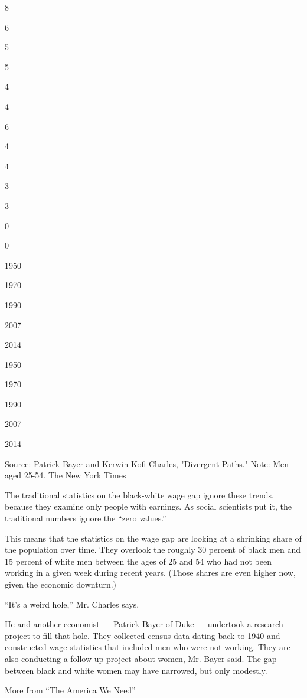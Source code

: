 8

6

5

5

4

4

6

4

4

3

3

0

0

1950

1970

1990

2007

2014

1950

1970

1990

2007

2014

Source: Patrick Bayer and Kerwin Kofi Charles, "Divergent Paths." Note:
Men aged 25-54. \textbar{} The New York Times

The traditional statistics on the black-white wage gap ignore these
trends, because they examine only people with earnings. As social
scientists put it, the traditional numbers ignore the ``zero values.''

This means that the statistics on the wage gap are looking at a
shrinking share of the population over time. They overlook the roughly
30 percent of black men and 15 percent of white men between the ages of
25 and 54 who had not been working in a given week during recent years.
(Those shares are even higher now, given the economic downturn.)

``It's a weird hole,'' Mr. Charles says.

He and another economist --- Patrick Bayer of Duke ---
\href{https://academic.oup.com/qje/article/133/3/1459/4830121}{undertook
a research project to fill that hole}. They collected census data dating
back to 1940 and constructed wage statistics that included men who were
not working. They are also conducting a follow-up project about women,
Mr. Bayer said. The gap between black and white women may have narrowed,
but only modestly.

More from ``The America We Need''
\href{https://www.nytimes.com/2020/07/04/opinion/sunday/women-work-coronavirus.html?action=click\&pgtype=Article\&state=default\&region=MAIN_CONTENT_2\&context=storylines_related_links}{}

